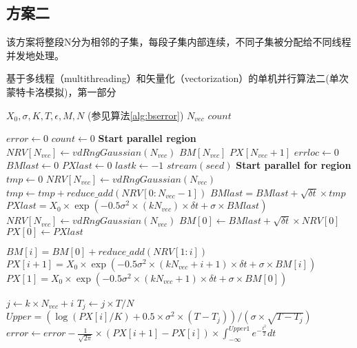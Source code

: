 \subsection{方案二}
该方案将整段N分为相邻的子集，每段子集内部连续，不同子集被分配给不同线程并发地处理。
\begin{algorithm}
  \caption{基于多线程（multithreading）和矢量化（vectorization）的单机并行算法二(单次蒙特卡洛模拟)，第一部分}
  \label{alg:omp2_1}
  \begin{algorithmic}[1]
    \Require $X_0, \sigma, K, T, \epsilon, M, N$ (参见算法\ref{alg:bserror})
    \Require $N_{vec}$ 
    \Ensure $count$

    \State $error \gets 0$
    \State $count \gets 0$
    \State \textbf{Start parallel region} 
    \State $NRV[N_{vec}] \gets vdRngGaussian(N_{vec})$  
    \State $BM[N_{vec}]$ 
    \State $PX[N_{vec}+1]$ 
    \State $errloc \gets 0$ 
    \State $BMlast \gets 0$ 
    \State $PXlast \gets 0$ 
    \State $lastk \gets -1$ 
    \State $stream(seed)$ 
    \State \textbf{Start parallel for region} 
    \State $tmp \gets 0$
    \State $NRV[N_{vec}] \gets vdRngGaussian(N_{vec})$ 
    \State $tmp \gets tmp + reduce\_add(NRV[0:N_{vec}-1])$ 
    \EndFor
    \State $BMlast = BMlast + \sqrt{\delta t}\times tmp$
    \State $PXlast = X_0 \times \exp(-0.5 \sigma^2 \times (kN_{vec}) \times \delta t + \sigma \times BMlast)$
    \State $NRV[N_{vec}] \gets vdRngGaussian(N_{vec})$ 
    \State $BM[0] \gets BMlast + \sqrt{\delta t}\times NRV[0]$
    \State $PX[0] \gets PXlast$

    \State $BM[i] = BM[0] + reduce\_add(NRV[1:i])$ 
    \State $PX[i+1] = X_0 \times \exp(-0.5 \sigma^2 \times (kN_{vec}+i+1) \times \delta t + \sigma \times BM[i])$
    \EndFor
    \State $PX[1] = X_0 \times \exp(-0.5 \sigma^2 \times (kN_{vec}+1) \times \delta t + \sigma \times BM[0])$

    \State $j \gets k\times N_{vec}+i$
    \State $T_j \gets j\times T/N$
    \State $Upper = (\log(PX[i]/K)+0.5\times \sigma^2 \times (T-T_j))/(\sigma \times \sqrt{T-T_j})$
    \State $error \gets error - \frac{1}{\sqrt{2\pi}}\times (PX[i+1]-PX[i])\times \int_{-\infty}^{Upper1}e^{-\frac{t^2}{2}}dt$
    \EndFor
    

\end{algorithmic}
\end{algorithm}
